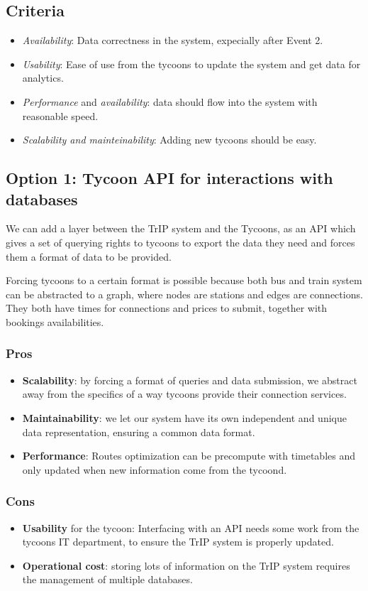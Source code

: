 \subsection*{Criteria}
\begin{itemize}
    \item \textit{Availability}: Data correctness in the system, expecially after Event 2.
    \item \textit{Usability}: Ease of use from the tycoons to update the system and get data for analytics.
    \item \textit{Performance} and \textit{availability}: data should flow into the system with reasonable speed.
    \item \textit{Scalability and mainteinability}: Adding new tycoons should be easy.
\end{itemize}

\subsection*{Option 1: Tycoon API for interactions with databases}

We can add a layer between the TrIP system and the Tycoons, as an API which gives a set of querying rights to tycoons to export the data they need and forces them a format of data to be provided.

Forcing tycoons to a certain format is possible because both bus and train system can be abstracted to a graph, where nodes are stations and edges are connections.
They both have times for connections and prices to submit, together with bookings availabilities.
\subsubsection*{Pros}
\begin{itemize}[noitemsep]
    \item \textbf{Scalability}: by forcing a format of queries and data submission, we abstract away from the specifics of a way tycoons provide their connection services.
    \item \textbf{Maintainability}: we let our system have its own independent and unique data representation, ensuring a common data format.
    \item \textbf{Performance}: Routes optimization can be precompute with timetables and only updated when new information come from the tycoond.
\end{itemize}
\subsubsection*{Cons}
\begin{itemize}[noitemsep]
    \item \textbf{Usability} for the tycoon: Interfacing with an API needs some work from the tycoons IT department, to ensure the TrIP system is properly updated.
    \item \textbf{Operational cost}: storing lots of information on the TrIP system requires the management of multiple databases.
\end{itemize}


